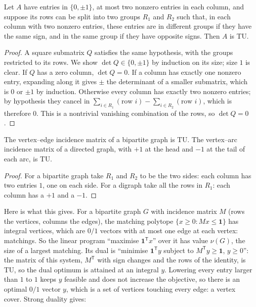 \begin{theorem}\label{thm:tucriterion}
Let $A$ have entries in $\{0,\pm1\}$, at most two nonzero entries in each column, and suppose its rows can be split into two groups $R_1$ and $R_2$ such that, in each column with two nonzero entries, these entries are in
different groups if they have the same sign, and in the same group if they have opposite signs. Then $A$ is TU.
\end{theorem}
\begin{proof}
A square submatrix $Q$ satisfies the same hypothesis, with the groups restricted to its rows. We show $\det Q\in\{0,\pm1\}$ by induction on its size; size $1$ is clear. If $Q$ has a zero column, $\det Q=0$. If a column has exactly one
nonzero entry, expanding along it gives $\pm$ the determinant of a smaller submatrix, which is $0$ or $\pm1$ by induction. Otherwise every column has exactly two nonzero entries; by hypothesis they cancel in
$\sum_{i\in R_1}(\text{row }i)-\sum_{i\in R_2}(\text{row }i)$, which is therefore $0$. This is a nontrivial vanishing combination of the rows, so $\det Q=0$.
\end{proof}

\begin{corollary}\label{cor:tugraphs}
The vertex--edge incidence matrix of a bipartite graph is TU. The vertex--arc incidence matrix of a directed graph, with $+1$ at the head and $-1$ at the tail of each arc, is TU.
\end{corollary}
\begin{proof}
For a bipartite graph take $R_1$ and $R_2$ to be the two sides: each column has two entries $1$, one on each side. For a digraph take all the rows in $R_1$: each column has a $+1$ and a $-1$.
\end{proof}

Here is what this gives. For a bipartite graph $G$ with incidence matrix $M$ (rows the vertices, columns the edges), the matching polytope $\{x\ge0:Mx\le\mathbf 1\}$ has integral vertices, which are $0/1$ vectors with at most
one edge at each vertex: matchings. So the linear program ``maximise $\mathbf 1^{\mathsf T}x$'' over it has value $\nu(G)$, the size of a largest matching. Its dual is ``minimise $\mathbf 1^{\mathsf T}y$ subject to $M^{\mathsf T}y\ge\mathbf 1$, $y\ge0$'': the matrix
of this system, $M^{\mathsf T}$ with sign changes and the rows of the identity, is TU, so the dual optimum is attained at an integral $y$. Lowering every entry larger than $1$ to $1$ keeps $y$ feasible and does not increase the objective, so there is an optimal
$0/1$ vector $y$, which is a set of vertices touching every edge: a vertex cover. Strong duality gives:

